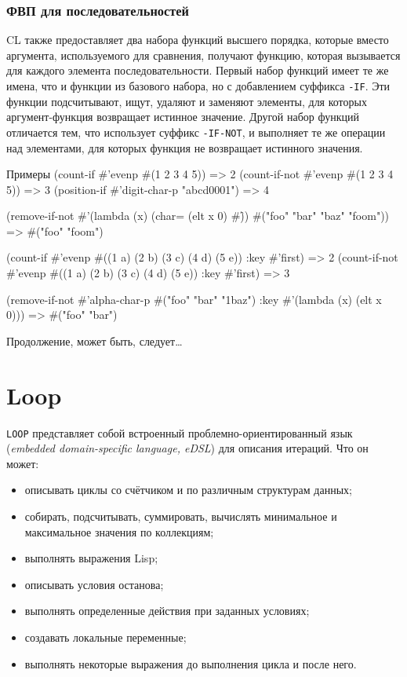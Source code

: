 \subsubsection{ФВП для последовательностей}
CL также предоставляет два набора функций высшего порядка, которые вместо аргумента, используемого для сравнения, получают функцию, которая вызывается для каждого элемента последовательности. Первый набор функций имеет те же имена, что и функции из базового набора, но с добавлением суффикса \lstinline{-IF}. Эти функции подсчитывают, ищут, удаляют и заменяют элементы, для которых аргумент-функция возвращает истинное значение. Другой набор функций отличается тем, что использует суффикс \lstinline{-IF-NOT}, и выполняет те же операции над элементами, для которых функция не возвращает истинного значения.
\begin{cllst}{Примеры}{}
(count-if #'evenp #(1 2 3 4 5))         => 2
(count-if-not #'evenp #(1 2 3 4 5))     => 3
(position-if #'digit-char-p "abcd0001") => 4

(remove-if-not #'(lambda (x) (char= (elt x 0) #\f))
  #("foo" "bar" "baz" "foom")) => #("foo" "foom")

(count-if #'evenp #((1 a) (2 b) (3 c) (4 d) (5 e)) :key #'first)     => 2
(count-if-not #'evenp #((1 a) (2 b) (3 c) (4 d) (5 e)) :key #'first) => 3

(remove-if-not #'alpha-char-p
  #("foo" "bar" "1baz") :key #'(lambda (x) (elt x 0))) => #("foo" "bar")
\end{cllst}

Продолжение, может быть, следует…

\section{Loop}
\lstinline{LOOP} представляет собой встроенный проблемно-ориентированный язык (\emph{embedded domain-specific language, eDSL}) для описания итераций. Что он может:
\begin{itemize}
  \item описывать циклы со счётчиком и по различным структурам данных;
  \item собирать, подсчитывать, суммировать, вычислять минимальное и максимальное значения по коллекциям;
  \item выполнять выражения Lisp;
  \item описывать условия останова;
  \item выполнять определенные действия при заданных условиях;
  \item создавать локальные переменные;
  \item выполнять некоторые выражения до выполнения цикла и после него.
\end{itemize}

